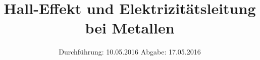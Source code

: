 

\subject{V 311}
\title{Hall-Effekt und Elektrizitätsleitung bei Metallen}
\date{
  Durchführung: 10.05.2016
  \hspace{3em}
  Abgabe: 17.05.2016
}



\maketitle
\thispagestyle{empty}
\tableofcontents
\newpage






\printbibliography



